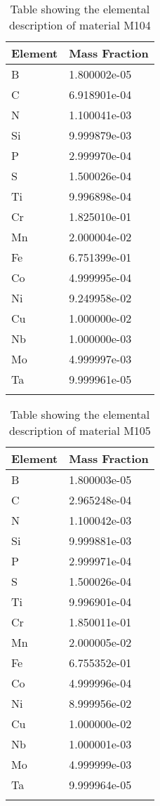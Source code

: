 \begin{centering}
\begin{longtable}[ht!]
{ p{} | p{} }
\hline
Element & Mass Fraction\\
\hline
B &  1.800002e-05\\
C &  6.918901e-04\\
N &  1.100041e-03\\
Si &  9.999879e-03\\
P &  2.999970e-04\\
S &  1.500026e-04\\
Ti &  9.996898e-04\\
Cr &  1.825010e-01\\
Mn &  2.000004e-02\\
Fe &  6.751399e-01\\
Co &  4.999995e-04\\
Ni &  9.249958e-02\\
Cu &  1.000000e-02\\
Nb &  1.000000e-03\\
Mo &  4.999997e-03\\
Ta &  9.999961e-05\\

\caption{Table showing the elemental description of material M104}
\label{table:material_M104}
\end{longtable}
\clearpage

\begin{longtable}[ht!]
  { p{} | p{} }
\hline
Element & Mass Fraction\\
\hline
B &  1.800003e-05\\
C &  2.965248e-04\\
N &  1.100042e-03\\
Si &  9.999881e-03\\
P &  2.999971e-04\\
S &  1.500026e-04\\
Ti &  9.996901e-04\\
Cr &  1.850011e-01\\
Mn &  2.000005e-02\\
Fe &  6.755352e-01\\
Co &  4.999996e-04\\
Ni &  8.999956e-02\\
Cu &  1.000000e-02\\
Nb &  1.000001e-03\\
Mo &  4.999999e-03\\
Ta &  9.999964e-05\\

\caption{Table showing the elemental description of material M105}
\label{table:material_M105}
\end{longtable}
\clearpage


\end{centering}
